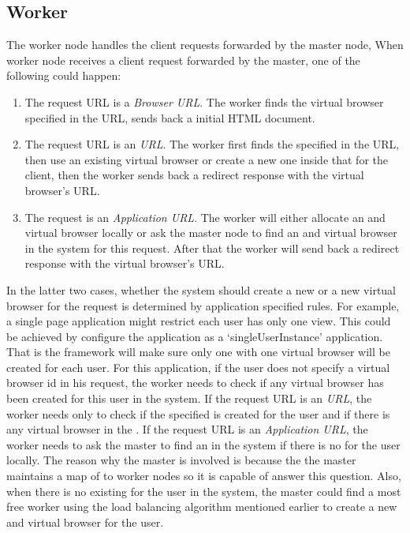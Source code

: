 \subsection{Worker}
\label{sec:worker}
The worker node handles the client requests forwarded by the master node,
When worker node receives a client request forwarded by the master,
one of the following could happen:
\begin{enumerate}
    \item The request URL is a \emph{Browser URL}.
     The worker finds the virtual browser specified in the URL, sends back a initial HTML document.
    \item The request URL is an \emph{\appins{} URL}.
        The worker first finds the \appins{} specified in the URL, 
        then use an existing virtual browser or create a new one inside that \appins{} for the client, 
        then the worker sends back a redirect response with the virtual browser's URL.
    \item The request is an \emph{Application URL}. 
    The worker will either allocate an \appins{} and virtual browser locally 
    or ask the master node to find an \appins{} and virtual browser 
    in the system for this request.
    After that the worker will send back a redirect response with the
    virtual browser's URL.
\end{enumerate}
In the latter two cases,
whether the system should create a new \appins{} or a new virtual browser 
for the request is determined by application specified rules.
For example, 
a single page application might restrict each user has only one view.
This could be achieved by configure the application as a `singleUserInstance' 
application.
That is the framework will make sure only one \appins{} with one virtual browser
will be created for each user.
For this application, if the user does not specify a virtual browser id
in his request,
the worker needs to check if any virtual browser has been created for this user
in the system.
If the request URL is an \emph{\appins{} URL},
the worker needs only to check if the specified \appins{} is created for the user
and if there is any virtual browser in the \appins{}.
If the request URL is an \emph{Application URL},
the worker needs to ask the master to find an \appins{} in the system
if there is no \appins{} for the user locally.
The reason why the master is involved is because
the the master maintains 
a map of \appins{} to worker nodes so it is capable of answer this question.
Also, when there is no existing \appins{} for the user in the system,
the master could find a most free worker using the load balancing algorithm mentioned
earlier to create a new \appins{} and virtual browser for the user.

